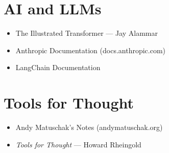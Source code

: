 \section{AI and LLMs}

\begin{itemize}
    \item The Illustrated Transformer --- Jay Alammar
    \item Anthropic Documentation (docs.anthropic.com)
    \item LangChain Documentation
\end{itemize}

\section{Tools for Thought}

\begin{itemize}
    \item Andy Matuschak's Notes (andymatuschak.org)
    \item \emph{Tools for Thought} --- Howard Rheingold
\end{itemize}

